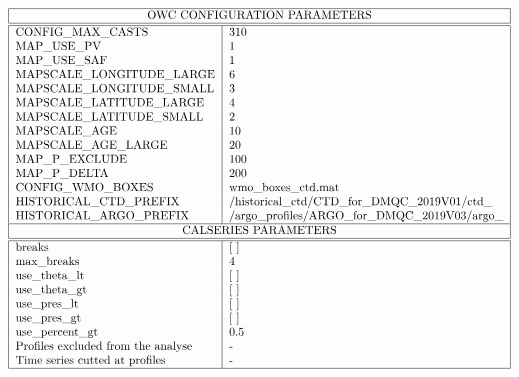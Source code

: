 \begin{table}[h]
$$
\begin{tabular}{|l|l|}
\hline
\multicolumn{2}{|c|}{OWC CONFIGURATION PARAMETERS}  \\
\hline
\hline
CONFIG\_MAX\_CASTS		& 310     	\\
MAP\_USE\_PV			& 1       	\\
MAP\_USE\_SAF		        & 1        	\\
MAPSCALE\_LONGITUDE\_LARGE	& 6     	\\
MAPSCALE\_LONGITUDE\_SMALL	& 3        \\
MAPSCALE\_LATITUDE\_LARGE 	& 4           \\
MAPSCALE\_LATITUDE\_SMALL 	& 2      \\
MAPSCALE\_AGE		 	& 10    \\
MAPSCALE\_AGE\_LARGE		& 20    	\\
MAP\_P\_EXCLUDE		 	& 100      \\
MAP\_P\_DELTA		 	& 200      \\
CONFIG\_WMO\_BOXES       &wmo\_boxes\_ctd.mat   \\
HISTORICAL\_CTD\_PREFIX  &/historical\_ctd/CTD\_for\_DMQC\_2019V01/ctd\_   \\
HISTORICAL\_ARGO\_PREFIX  &/argo\_profiles/ARGO\_for\_DMQC\_2019V03/argo\_  \\ 
\hline
\multicolumn{2}{|c|}{CALSERIES PARAMETERS}  \\
\hline
\hline
breaks         & [ ] \\
max\_breaks       & 4 \\
 use\_theta\_lt    & [ ] \\
 use\_theta\_gt    & [ ] \\
 use\_pres\_lt    & [ ] \\
 use\_pres\_gt    & [ ] \\
use\_percent\_gt    & 0.5\\
Profiles excluded from the analyse    & - \\
Time series cutted at profiles    & - \\
\hline
\end{tabular}
$$
\caption{Parameters of the OWC method }
\label{tab3}
\end{table}

